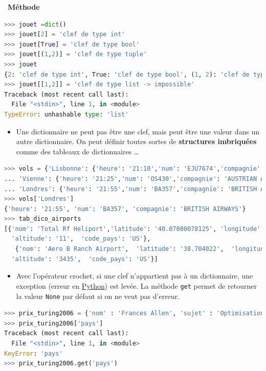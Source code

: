\documentclass[
  11pt,
]{article}
\newcommand{\passthrough}[1]{#1}
\providecommand{\tightlist}{%
  \setlength{\itemsep}{0pt}\setlength{\parskip}{0pt}}
\newenvironment{methode}[1]
{\par \medskip    \noindent  
 \begin {bclogo}[arrondi =0.1,logo=\bcoutil, marge=4,noborder = true] {~\textbf{Méthode}   {\itshape #1} }  \par}
{
\end{bclogo}
 \par \bigskip }
\begin{document}
\begin{methode}{}
\begin{lstlisting}[language=Python]
>>> jouet =dict()
>>> jouet[2] = 'clef de type int'
>>> jouet[True] = 'clef de type bool'
>>> jouet[(1,2)] = 'clef de type tuple'
>>> jouet
{2: 'clef de type int', True: 'clef de type bool', (1, 2): 'clef de type tuple'}
>>> jouet[[1,2]] = 'clef de type list -> impossible'
Traceback (most recent call last):
  File "<stdin>", line 1, in <module>
TypeError: unhashable type: 'list'
\end{lstlisting}

\begin{itemize}
\tightlist
\item
  Une dictionnaire ne peut pas être une clef, mais peut être une valeur
  dans un autre dictionnaire. On peut définir toutes sortes de
  \textbf{structures imbriquées} comme des tableaux de dictionnaires
  \ldots{}
\end{itemize}

\begin{lstlisting}[language=Python]
>>> vols = {'Lisbonne': {'heure': '21:10','num': 'EJU7674','compagnie': 'EASYJET'},
... 'Vienne': {'heure': '21:25','num': 'OS430','compagnie': 'AUSTRIAN AIRLINES'},
... 'Londres': {'heure': '21:55','num': 'BA357','compagnie': 'BRITISH AIRWAYS'}}
>>> vols['Londres']
{'heure': '21:55', 'num': 'BA357', 'compagnie': 'BRITISH AIRWAYS'}
>>> tab_dico_airports
[{'nom': 'Total Rf Heliport','latitude': '40.07080078125', 'longitude': '-74.93360137939453',
  'altitude': '11',  'code_pays': 'US'},
   {'nom': 'Aero B Ranch Airport',  'latitude': '38.704022',  'longitude': '-101.473911',
  'altitude': '3435',  'code_pays': 'US'}]
\end{lstlisting}

\begin{itemize}
\tightlist
\item
  Avec l'opérateur crochet, si une clef n'appartient pas à un
  dictionnaire, une exception (erreur en
  \href{https://docs.python.org/3/tutorial/datastructures.html}{Python})
  est levée. La méthode \passthrough{\lstinline!get!} permet de
  retourner la valeur \passthrough{\lstinline!None!} par défaut si on ne
  veut pas d'erreur.
\end{itemize}

\begin{lstlisting}[language=Python]
>>> prix_turing2006 = {'nom' : 'Frances Allen', 'sujet' : 'Optimisation des compilateurs'}
>>> prix_turing2006['pays']
Traceback (most recent call last):
  File "<stdin>", line 1, in <module>
KeyError: 'pays'
>>> prix_turing2006.get('pays')
\end{lstlisting}

\end{methode}
\end{document}
